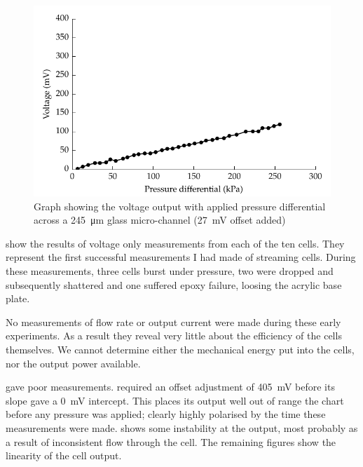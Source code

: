 \begin{figure}
    \centering
    \includegraphics{content/pt1/01-PowerHarvesting/graphics/streamingCell_voltVsPress_245um_out}
    \caption{\label{fig:VvsP_245um}Graph showing the voltage output with applied pressure differential across a \SI{245}{\micro\metre} glass micro-channel (\SI{27}{\milli\volt} offset added)}
\end{figure}

 show the results of voltage only measurements from each of the ten cells.
They represent the first successful measurements I had made of streaming cells.
During these measurements, three cells burst under pressure, two were dropped and subsequently shattered and one suffered epoxy failure, loosing the acrylic base plate.

No measurements of flow rate or output current were made during these early experiments.
As a result they reveal very little about the efficiency of the cells themselves.
We cannot determine either the mechanical energy put into the cells, nor the output power available.

 gave poor measurements.
 required an offset adjustment of \SI{405}{\milli\volt} before its slope gave a \SI{0}{\milli\volt} intercept.
This places its output well out of range the chart before any pressure was applied; clearly highly polarised by the time these measurements were made.
 shows some instability at the output, most probably as a result of inconsistent flow through the cell.
The remaining figures show the linearity of the cell output.

